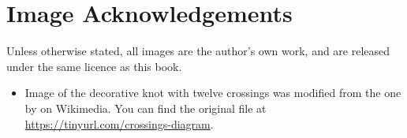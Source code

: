 \chapter{Image Acknowledgements}
Unless otherwise stated, all images are the author's own work, and are released under the same licence as this book.

\begin{itemize}
    \item Image of the decorative knot with twelve crossings was modified from the one by  on Wikimedia. You can find the original file at \url{https://tinyurl.com/crossings-diagram}.
\end{itemize}
